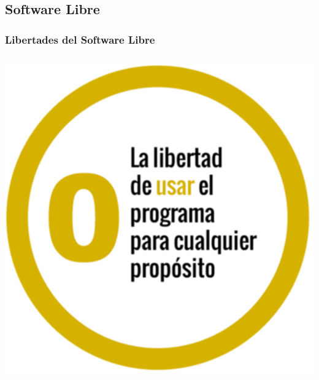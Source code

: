 \subsection{Software Libre}
\begin{frame}
    \frametitle{Libertades del Software Libre}
    \begin{columns}
            \includegraphics[width=\textwidth]{Libertad-0.png}
    \end{columns}
\end{frame}

